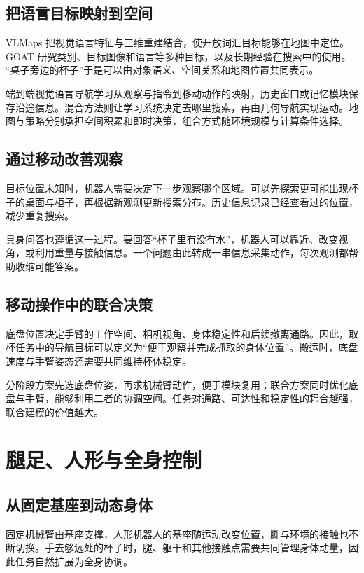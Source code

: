 \documentclass[UTF8,a4paper,11pt,oneside,openany,fontset=none]{ctexbook}
\begin{document}
\section{把语言目标映射到空间}

VLMaps 把视觉语言特征与三维重建结合，使开放词汇目标能够在地图中定位。\cite{R32} GOAT 研究类别、目标图像和语言等多种目标，以及长期经验在搜索中的使用。\cite{R33} ``桌子旁边的杯子''于是可以由对象语义、空间关系和地图位置共同表示。

端到端视觉语言导航学习从观察与指令到移动动作的映射，历史窗口或记忆模块保存沿途信息。混合方法则让学习系统决定去哪里搜索，再由几何导航实现运动。地图与策略分别承担空间积累和即时决策，组合方式随环境规模与计算条件选择。

\section{通过移动改善观察}

目标位置未知时，机器人需要决定下一步观察哪个区域。可以先探索更可能出现杯子的桌面与柜子，再根据新观测更新搜索分布。历史信息记录已经查看过的位置，减少重复搜索。

具身问答也遵循这一过程。要回答``杯子里有没有水''，机器人可以靠近、改变视角，或利用重量与接触信息。一个问题由此转成一串信息采集动作，每次观测都帮助收缩可能答案。

\section{移动操作中的联合决策}

底盘位置决定手臂的工作空间、相机视角、身体稳定性和后续撤离通路。因此，取杯任务中的导航目标可以定义为``便于观察并完成抓取的身体位置''。搬运时，底盘速度与手臂姿态还需要共同维持杯体稳定。

分阶段方案先选底盘位姿，再求机械臂动作，便于模块复用；联合方案同时优化底盘与手臂，能够利用二者的协调空间。任务对通路、可达性和稳定性的耦合越强，联合建模的价值越大。

\chapter{腿足、人形与全身控制}

\section{从固定基座到动态身体}

固定机械臂由基座支撑，人形机器人的基座随运动改变位置，脚与环境的接触也不断切换。手去够远处的杯子时，腿、躯干和其他接触点需要共同管理身体动量，因此任务自然扩展为全身协调。
\end{document}
